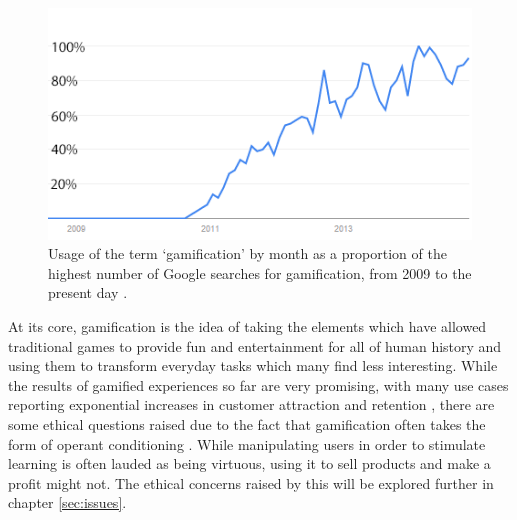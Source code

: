 \documentclass[12pt,a4paper,twoside]{report}
\begin{document}
\begin{figure}
\begin{center}
	\includegraphics{../img/usage-graph.png}
	\caption{Usage of the term `gamification' by month as a proportion of the highest number of Google searches for gamification, from 2009 to the present day \cite{usage}.}
	\label{usagegraph}
\end{center}
\end{figure}

At its core, gamification is the idea of taking the elements which have allowed traditional games to provide fun and entertainment for all of human history and using them to transform everyday tasks which many find less interesting. While the results of gamified experiences so far are very promising, with many use cases reporting exponential increases in customer attraction and retention \cite{zichermann2010game}, there are some ethical questions raised due to the fact that gamification often takes the form of operant conditioning \cite{kapp2012gamification}. While manipulating users in order to stimulate learning is often lauded as being virtuous, using it to sell products and make a profit might not. The ethical concerns raised by this will be explored further in chapter \ref{sec:issues}.
\end{document}

